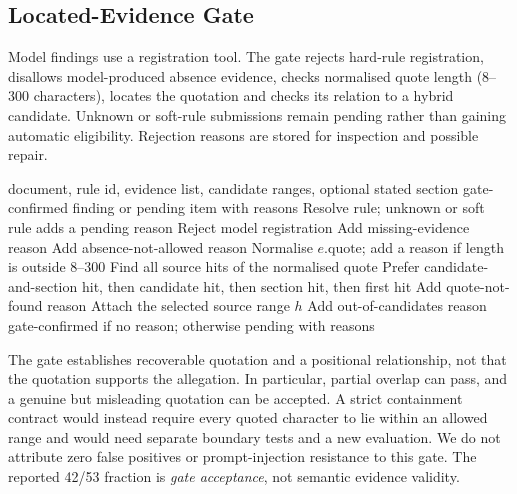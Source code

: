 \documentclass[computers,article,submit,moreauthors]{Definitions/mdpi}
\begin{document}
\subsection{Located-Evidence Gate}\label{sec:gate}

Model findings use a registration tool. The gate rejects hard-rule registration, disallows model-produced absence evidence, checks normalised quote length (8--300 characters), locates the quotation and checks its relation to a hybrid candidate. Unknown or soft-rule submissions remain pending rather than gaining automatic eligibility. Rejection reasons are stored for inspection and possible repair.

\begin{algo}[H]
\caption{Gate in the evaluated prototype (simplified). Scope membership is overlap, not complete containment; location does not establish entailment.}
\label{alg:gate}
\begin{algorithmic}[1]
\Require document, rule id, evidence list, candidate ranges, optional stated section
\Ensure gate-confirmed finding or pending item with reasons
\State Resolve rule; unknown or soft rule adds a pending reason
 \State Reject model registration \EndIf
{} \State Add missing-evidence reason \EndIf
{}
    \State Add absence-not-allowed reason
  \EndIf
  \State Normalise $e.\text{quote}$; add a reason if length is outside 8--300
  \State Find all source hits of the normalised quote
  \State Prefer candidate-and-section hit, then candidate hit, then section hit, then first hit
   \State Add quote-not-found reason
  \Else
    \State Attach the selected source range $h$
     \State Add out-of-candidates reason \EndIf
  \EndIf
\EndFor
\State \Return gate-confirmed if no reason; otherwise pending with reasons
\end{algorithmic}
\end{algo}

The gate establishes recoverable quotation and a positional relationship, not that the quotation supports the allegation. In particular, partial overlap can pass, and a genuine but misleading quotation can be accepted. A strict containment contract would instead require every quoted character to lie within an allowed range and would need separate boundary tests and a new evaluation. We do not attribute zero false positives or prompt-injection resistance to this gate. The reported 42/53 fraction is \emph{gate acceptance}, not semantic evidence validity.
\end{document}
